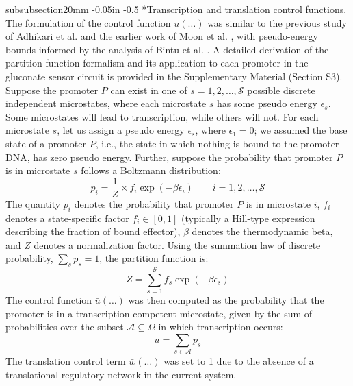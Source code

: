 \documentclass[12pt]{article}
\makeatletter
\renewcommand\subsubsection{\@startsection
	{subsubsection}{2}{0mm}
	{-0.05in}
	{-0.5\baselineskip}
	{\normalfont\normalsize\itshape}}
\makeatother
\begin{document}
\subsubsection*{Transcription and translation control functions.}
The formulation of the control function $\bar{u}(\dots)$ was similar to the previous study of Adhikari et al. \cite{adhikari2020effective} and the earlier work of Moon et al. \cite{Moon:2012aa}, with pseudo-energy bounds informed by the analysis of Bintu et al. \cite{bintu2005transcriptional}. A detailed derivation of the partition function formalism and its application to each promoter in the gluconate sensor circuit is provided in the Supplementary Material (Section S3). Suppose the promoter $P$ can exist in one of $s = 1, 2, \dots, \mathcal{S}$ possible discrete independent microstates, where each microstate $s$ has some pseudo energy $\epsilon_s$. Some microstates will lead to transcription, while others will not. For each microstate $s$, let us assign a pseudo energy $\epsilon_s$, where $\epsilon_1 = 0$; we assumed the base state of a promoter $P$, i.e., the state in which nothing is bound to the promoter-DNA, has zero pseudo energy. Further, suppose the probability that promoter $P$ is in microstate $s$ follows a Boltzmann distribution:
\begin{equation}
p_i = \frac{1}{Z} \times f_i \exp\left(-\beta\epsilon_i\right) \qquad i = 1, 2, \dots, \mathcal{S}
\end{equation}
The quantity $p_i$ denotes the probability that promoter $P$ is in microstate $i$, $f_i$ denotes a state-specific factor $f_i \in [0,1]$ (typically a Hill-type expression describing the fraction of bound effector), $\beta$ denotes the thermodynamic beta, and $Z$ denotes a normalization factor. Using the summation law of discrete probability, $\sum_s p_s = 1$, the partition function is:
\begin{equation}
Z = \sum_{s=1}^{\mathcal{S}} f_s \exp\left(-\beta\epsilon_s\right)
\end{equation}
The control function $\bar{u}(\dots)$ was then computed as the probability that the promoter is in a transcription-competent microstate, given by the sum of probabilities over the subset $\mathcal{A} \subseteq \Omega$ in which transcription occurs:
\begin{equation}
\bar{u} = \sum_{s \in \mathcal{A}} p_s
\end{equation}
The translation control term $\bar{w}(\dots)$ was set to 1 due to the absence of a translational regulatory network in the current system.
\end{document}
